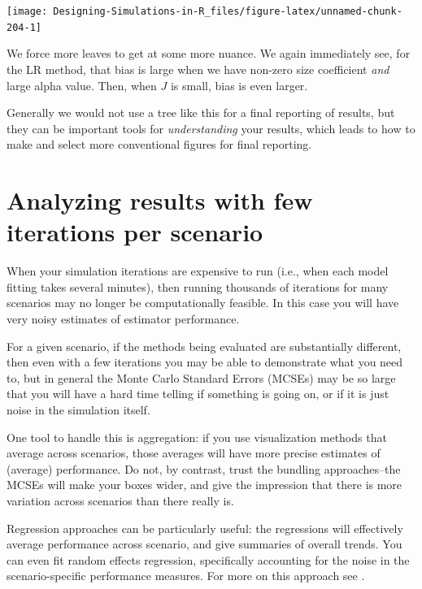 \documentclass[
]{book}
\begin{document}
\begin{center}\texttt{[image: Designing-Simulations-in-R\_files/figure-latex/unnamed-chunk-204-1]} \end{center}

We force more leaves to get at some more nuance.
We again immediately see, for the LR method, that bias is large when we have non-zero size coefficient \emph{and} large alpha value.
Then, when \(J\) is small, bias is even larger.

Generally we would not use a tree like this for a final reporting of results, but they can be important tools for \emph{understanding} your results, which leads to how to make and select more conventional figures for final reporting.

\section{Analyzing results with few iterations per scenario}\label{analyzing-results-with-few-iterations-per-scenario}

When your simulation iterations are expensive to run (i.e., when each model fitting takes several minutes), then running thousands of iterations for many scenarios may no longer be computationally feasible.
In this case you will have very noisy estimates of estimator performance.

For a given scenario, if the methods being evaluated are substantially different, then even with a few iterations you may be able to demonstrate what you need to, but in general the Monte Carlo Standard Errors (MCSEs) may be so large that you will have a hard time telling if something is going on, or if it is just noise in the simulation itself.

One tool to handle this is aggregation: if you use visualization methods that average across scenarios, those averages will have more precise estimates of (average) performance.
Do not, by contrast, trust the bundling approaches--the MCSEs will make your boxes wider, and give the impression that there is more variation across scenarios than there really is.

Regression approaches can be particularly useful: the regressions will effectively average performance across scenario, and give summaries of overall trends.
You can even fit random effects regression, specifically accounting for the noise in the scenario-specific performance measures.
For more on this approach see \citet{gilbert2024multilevel}.
\end{document}
